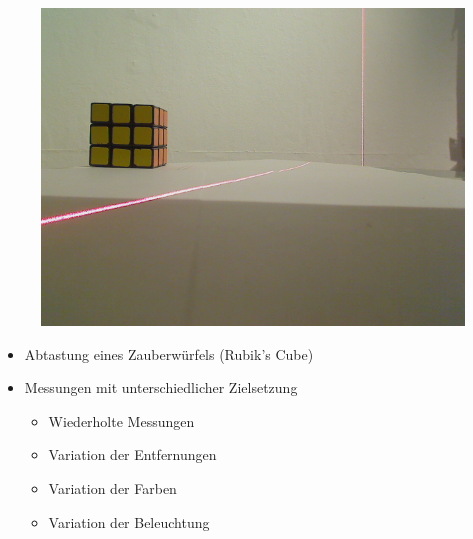 \documentclass[xcolor=dvipsnames]{beamer}
\begin{document}
\begin{frame}
\begin{figure}
\begin{minipage}{0.32\linewidth}
		\end{minipage}
		\hfill
		\begin{minipage}{0.32\linewidth}
			\includegraphics[width=\linewidth]{includes/test_repeat_3}
		\end{minipage}
	\end{figure}

	\begin{itemize}
		\item Abtastung eines Zauberwürfels (Rubik's Cube)
		\item Messungen mit unterschiedlicher Zielsetzung
		\begin{itemize}
			\item Wiederholte Messungen
			\item Variation der Entfernungen
			\item Variation der Farben
			\item Variation der Beleuchtung
		\end{itemize}
	\end{itemize}

\end{frame}
\end{document}
